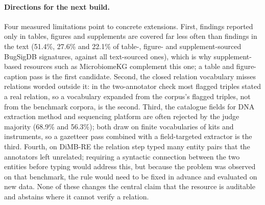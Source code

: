\documentclass[referee,lineno,pdflatex,sn-vancouver-num]{sn-jnl}
\theoremstyle{thmstyleone}%
\theoremstyle{thmstyletwo}%
\theoremstyle{thmstylethree}%
\begin{document}
\paragraph{Directions for the next build.} Four measured limitations point
to concrete extensions. First, findings reported only in tables, figures and
supplements are covered far less often than findings in the text (51.4\%,
27.6\% and 22.1\% of table-, figure- and supplement-sourced BugSigDB signatures,
against all text-sourced ones), which is why supplement-based resources such as
MicrobiomeKG complement this one; a table and figure-caption pass is the first
candidate. Second, the closed relation vocabulary misses relations worded
outside it: in the two-annotator check most flagged triples stated a real
relation, so a vocabulary expanded from the corpus's flagged triples, not
from the benchmark corpora, is the second. Third, the catalogue fields for DNA
extraction method and sequencing platform are often rejected by the judge
majority (68.9\% and 56.3\%); both draw on finite vocabularies of kits and
instruments, so a gazetteer pass combined with a field-targeted extractor is the
third. Fourth, on DiMB-RE the relation step typed many entity pairs that the
annotators left unrelated; requiring a syntactic connection between the two
entities before typing would address this, but because the problem was
observed on that benchmark, the rule would need to be fixed in advance and
evaluated on new data. None of these changes the central claim that the
resource is auditable and abstains where it cannot verify a relation.
\end{document}
